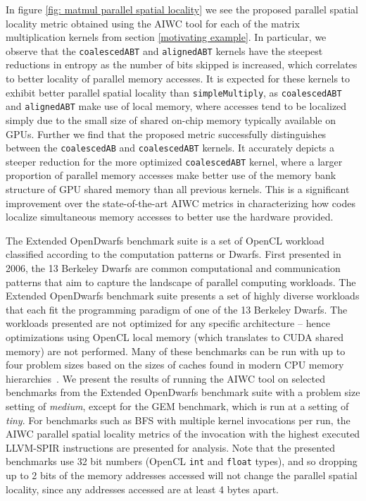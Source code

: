 \documentclass[review=false, sigchi]{acmart}
\begin{document}
	In figure \ref{fig: matmul parallel spatial locality} we see the proposed parallel spatial locality metric obtained using the AIWC tool for each of the matrix multiplication kernels from section \ref{motivating example}.
	In particular, we observe that the \texttt{coalescedABT} and \texttt{alignedABT} kernels have the steepest reductions in entropy as the number of bits skipped is increased, which correlates to better locality of parallel memory accesses.
	It is expected for these kernels to exhibit better parallel spatial locality than \texttt{simpleMultiply}, as \texttt{coalescedABT} and \texttt{alignedABT} make use of local memory, where accesses tend to be localized simply due to the small size of shared on-chip memory typically available on GPUs.
	Further we find that the proposed metric successfully distinguishes between the \texttt{coalescedAB} and \texttt{coalescedABT} kernels.
	It accurately depicts a steeper reduction for the more optimized \texttt{coalescedABT} kernel, where a larger proportion of parallel memory accesses make better use of the memory bank structure of GPU shared memory than all previous kernels.
	This is a significant improvement over the state-of-the-art AIWC metrics in characterizing how codes localize simultaneous memory accesses to better use the hardware provided.
	
	The Extended OpenDwarfs benchmark suite is a set of OpenCL workload classified according to the computation patterns or Dwarfs. 
	First presented in 2006, the 13 Berkeley Dwarfs are common computational and communication patterns that aim to capture the landscape of parallel computing workloads. 
	The Extended OpenDwarfs benchmark suite presents a set of highly diverse workloads that each fit the programming paradigm of one of the 13 Berkeley Dwarfs.
	The workloads presented are not optimized for any specific architecture -- hence optimizations using OpenCL local memory (which translates to CUDA shared memory) are not performed. 
	Many of these benchmarks can be run with up to four problem sizes based on the sizes of caches found in modern CPU memory hierarchies~\cite{johnston18opendwarfs}.
	We present the results of running the AIWC tool on selected benchmarks from the Extended OpenDwarfs benchmark suite \cite{opendwarfs2020head,johnston18opendwarfs} with a problem size setting of \emph{medium}, except for the GEM benchmark, which is run at a setting of \emph{tiny}.
	For benchmarks such as BFS with multiple kernel invocations per run, the AIWC parallel spatial locality metrics of the invocation with the highest executed LLVM-SPIR instructions are presented for analysis. Note that the presented benchmarks use 32 bit numbers (OpenCL \texttt{int} and \texttt{float} types), and so dropping up to 2 bits of the memory addresses accessed will not change the parallel spatial locality, since any addresses accessed are at least 4 bytes apart.
	
\end{document}

